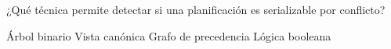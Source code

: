 \question[1] ¿Qué técnica permite detectar si una planificación es serializable por conflicto?
\begin{choices}
\choice Árbol binario
\choice Vista canónica
\CorrectChoice Grafo de precedencia
\choice Lógica booleana
\end{choices}